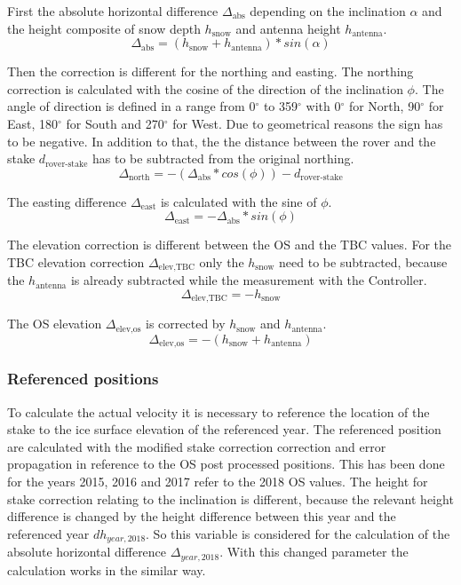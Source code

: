 First the absolute horizontal difference $\Delta_{\text{abs}}$ depending on the inclination $\alpha$ and the height composite of snow depth $h_{\text{snow}}$ and antenna height $h_{\text{antenna}}$.
\begin{equation}
	\Delta_{\text{abs}} = (h_{\text{snow}} + h_{\text{antenna}}) * sin(\alpha)
\end{equation}

Then the correction is different for the northing and easting. The northing correction is calculated with the cosine of the direction of the inclination $\phi$. 
The angle of direction is defined in a range from 0$^{\circ}$ to 359$^{\circ}$ with 0$^{\circ}$ for North, 90$^{\circ}$ for East, 180$^{\circ}$ for South and 270$^{\circ}$ for West.
Due to geometrical reasons the sign has to be negative. 
In addition to that, the the distance between the rover and the stake $d_{\text{rover-stake}}$ has to be subtracted from the original northing.
\begin{equation}
	\Delta_{\text{north}} = - (\Delta_{\text{abs}} * cos(\phi)) - d_{\text{rover-stake}}
\end{equation}

The easting difference $\Delta_{\text{east}}$ is calculated with the sine of $\phi$.
\begin{equation}
	\Delta_{\text{east}} = - \Delta_{\text{abs}} * sin(\phi)
\end{equation}

The elevation correction is different between the OS and the TBC values.
For the TBC elevation correction $\Delta_{\text{elev,TBC}}$ only the $h_{\text{snow}}$ need to be subtracted, because the $h_{\text{antenna}}$ is already subtracted while the measurement with the Controller.
\begin{equation}
	\Delta_{\text{elev,TBC}} = - h_{\text{snow}} 
\end{equation}

The OS elevation $\Delta_{\text{elev,os}}$ is corrected by $h_{\text{snow}}$ and $h_{\text{antenna}}$.
\begin{equation}
	\Delta_{\text{elev,os}} = - (h_{\text{snow}} + h_{\text{antenna}}) 
\end{equation}

\subsubsection*{Referenced positions}

To calculate the actual velocity it is necessary to reference the location of the stake to the ice surface elevation of the referenced year. 
The referenced position are calculated with the modified stake correction correction and error propagation in reference to the OS post processed positions. 
This has been done for the years 2015, 2016 and 2017 refer to the 2018 OS values.
The height for stake correction relating to the inclination is different, because the relevant height difference is changed by the height difference between this year and the referenced year $dh_{year,2018}$. So this variable is considered for the calculation of the absolute horizontal difference $\Delta_{year,2018}$. With this changed parameter the calculation works in the similar way.


